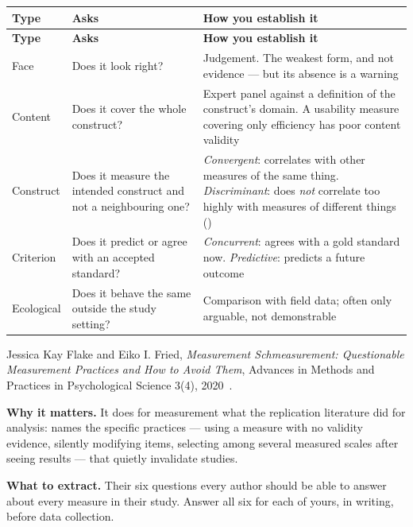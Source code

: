 \begin{center}
\small
\begin{longtable}{@{}L{3.0cm}L{4.4cm}L{6.8cm}@{}}
\toprule
\textbf{Type} & \textbf{Asks} & \textbf{How you establish it} \\
\midrule
\endfirsthead
\toprule
\textbf{Type} & \textbf{Asks} & \textbf{How you establish it} \\
\midrule
\endhead
\bottomrule
\endfoot
Face
  & Does it look right?
  & Judgement. The weakest form, and not evidence --- but its absence is a
    warning \\
Content
  & Does it cover the whole construct?
  & Expert panel against a definition of the construct's domain. A usability
    measure covering only efficiency has poor content validity \\
Construct
  & Does it measure the intended construct and not a neighbouring one?
  & \emph{Convergent}: correlates with other measures of the same thing.
    \emph{Discriminant}: does \emph{not} correlate too highly with measures of
    different things () \\
Criterion
  & Does it predict or agree with an accepted standard?
  & \emph{Concurrent}: agrees with a gold standard now.
    \emph{Predictive}: predicts a future outcome \\
Ecological
  & Does it behave the same outside the study setting?
  & Comparison with field data; often only arguable, not demonstrable \\
\end{longtable}
\end{center}

\begin{paperbox}
Jessica Kay Flake and Eiko I. Fried, \emph{Measurement Schmeasurement:
Questionable Measurement Practices and How to Avoid Them}, Advances in Methods
and Practices in Psychological Science 3(4), 2020~\cite{flake2020measurement}.

\medskip
\textbf{Why it matters.} It does for measurement what the replication
literature did for analysis: names the specific practices --- using a measure
with no validity evidence, silently modifying items, selecting among several
measured scales after seeing results --- that quietly invalidate studies.

\medskip
\textbf{What to extract.} Their six questions every author should be able to
answer about every measure in their study. Answer all six for each of yours,
in writing, before data collection.
\end{paperbox}

